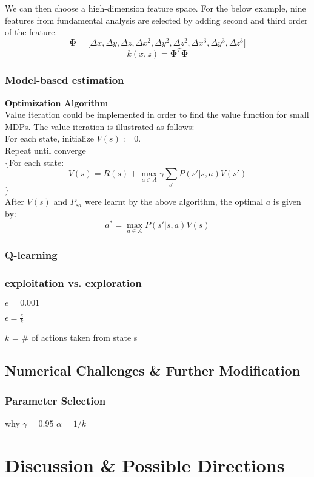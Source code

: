 \documentclass[11pt]{article}
\theoremstyle{definition}
\begin{document}
We can then choose a high-dimension feature space. For the below example, nine features from fundamental analysis are selected by adding second and third order of the feature.
$$\boldsymbol{\Phi} = \big[\Delta x,\Delta y,\Delta z, \Delta x^2,\Delta y^2,\Delta z^2,\Delta x^3,\Delta y^3,\Delta z^3 \big]$$ 
$$k(x,z) = \boldsymbol{\Phi}^T\boldsymbol{\Phi}$$
\subsubsection{Model-based estimation}
\textbf{ Optimization Algorithm}\\
Value iteration could be implemented in order to find the value function for small MDPs. The value iteration is illustrated as follows:\\

For each state, initialize $V(s):=0$.\\
Repeat until converge\\
$\{$For each state:
$$V(s) = R(s) + \max\limits_{a\in A}\gamma\sum_{s'}P(s'|s,a)V(s')$$
$\}$\\

After $V(s)$ and $P_{sa}$ were learnt by the above algorithm, the optimal $a$ is given by:
$$a^* = \max\limits_{a\in A}P(s'|s,a)V(s)$$
\subsubsection{Q-learning}
\subsubsection{exploitation vs. exploration}
$e = 0.001$

$\epsilon = \frac{e}{k}$

$k$ = \# of actions taken from state s

\subsection{\textbf{Numerical Challenges \& Further Modification}}

\subsubsection{Parameter Selection}
why $\gamma = 0.95$
$\alpha = 1/k$
\newpage
\section{\textbf{Discussion \& Possible Directions}}
\end{document}
